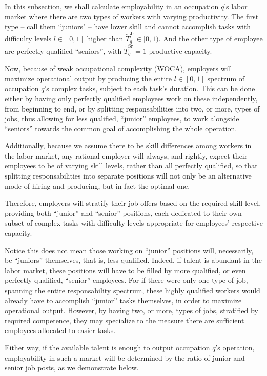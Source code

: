 \documentclass[hidelinks, nonatbib]{elsarticle}
\begin{document}
In this subsection, we shall calculate employability in an occupation $q$'s labor market where there are two types of workers with varying productivity. The first type -- call them ``juniors" -- have lower skill and cannot accomplish tasks with difficulty levels $l \in [0,1]$ higher than $\tilde{T}_{q}^{\text{Jr}} \in [0,1)$. And the other type of employee are perfectly qualified ``seniors'', with $\tilde{T}_{q}^{\text{Sr}} = 1$ productive capacity.

Now, because of weak occupational complexity (WOCA), employers will maximize operational output by producing the entire $l \in [0,1]$ spectrum of occupation $q$'s complex tasks, subject to each task's duration. This can be done either by having only perfectly qualified employees work on these independently, from beginning to end, or by splitting responsabilities into two, or more, types of jobs, thus allowing for less qualified, ``junior'' employees, to work alongside ``seniors'' towards the common goal of accomplishing the whole operation.

Additionally, because we assume there to be skill differences among workers in the labor market, any rational employer will always, and rightly, expect their employees to be of varying skill levels, rather than all perfectly qualified, so that splitting responsabilities into separate positions will not only be an alternative mode of hiring and producing, but in fact the optimal one.

Therefore, employers will stratify their job offers based on the required skill level, providing both ``junior'' and ``senior'' positions, each dedicated to their own subset of complex tasks with difficulty levels appropriate for employees' respective capacity.

Notice this does not mean those working on ``junior'' positions will, necessarily, be ``juniors'' themselves, that is, less qualified. Indeed, if talent is abundant in the labor market, these positions will have to be filled by more qualified, or even perfectly qualified, ``senior'' employees. For if there were only one type of job, spanning the entire responsability spectrum, these highly qualified workers would already have to accomplish ``junior'' tasks themselves, in order to maximize operational output. However, by having two, or more, types of jobs, stratified by required competence, they may specialize to the measure there are sufficient employees allocated to easier tasks.

Either way, if the available talent is enough to output occupation $q$'s operation, employability in such a market will be determined by the ratio of junior and senior job posts, as we demonstrate below.
\end{document}
